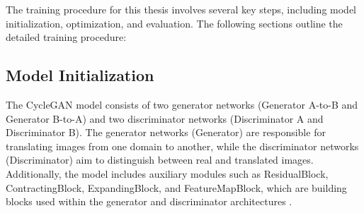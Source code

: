 \documentclass[UKenglish,12pt]{master-style}
\begin{document}
The training procedure for this thesis involves several key steps, including model initialization, optimization, and evaluation. The following sections outline the detailed training procedure:

\subsection{Model Initialization}

The CycleGAN model consists of two generator networks (Generator A-to-B and Generator B-to-A) and two discriminator networks (Discriminator A and Discriminator B). The generator networks (Generator) are responsible for translating images from one domain to another, while the discriminator networks (Discriminator) aim to distinguish between real and translated images. Additionally, the model includes auxiliary modules such as ResidualBlock, ContractingBlock, ExpandingBlock, and FeatureMapBlock, which are building blocks used within the generator and discriminator architectures \cite{CycleGAN} .
\end{document}
